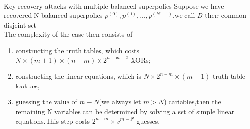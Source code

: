 \documentclass[notheorems,aspectratio=169]{beamer}
\begin{document}
\begin{frame}
    \
\begin{block}{Key recovery attacks with multiple balanced superpolies}
    Suppose we have recovered N balanced superpolies $p^{(0)},p^{(1)},...,p^{(N-1)}$,we call $D$ their common disjoint set    
    \\The complexity of the case then consists of
\end{block}
\begin{enumerate}
    \item constructing the truth tables, which costs {\color{red}$N \times (m+1) \times (n-m) \times 2^{n-m-2}$} XORs;
    \item constructing the linear equations, which is {\color{red}$N\times 2^{n-m} \times (m+1)$} truth table lookuos;
    \item guessing the value of $m-N$(we always let $m>N$) cariables,then the remaining N variables can be determined by 
     solving a set of simple linear equations.This step costs {\color{red}$2^{n-m}\times x^{m-N}$} guesses.
\end{enumerate}

\end{frame}
\end{document}

